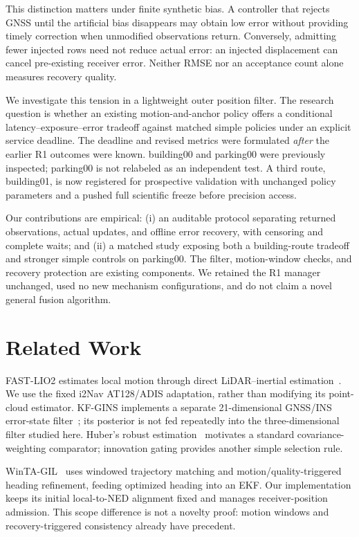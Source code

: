 \documentclass[conference]{IEEEtran}
\begin{document}
This distinction matters under finite synthetic bias. A controller that rejects GNSS until the artificial bias disappears may obtain low error without providing timely correction when unmodified observations return. Conversely, admitting fewer injected rows need not reduce actual error: an injected displacement can cancel pre-existing receiver error. Neither RMSE nor an acceptance count alone measures recovery quality.

We investigate this tension in a lightweight outer position filter. The research question is whether an existing motion-and-anchor policy offers a conditional latency--exposure--error tradeoff against matched simple policies under an explicit service deadline. The deadline and revised metrics were formulated \emph{after} the earlier R1 outcomes were known. building00 and parking00 were previously inspected; parking00 is not relabeled as an independent test. A third route, building01, is now registered for prospective validation with unchanged policy parameters and a pushed full scientific freeze before precision access.

Our contributions are empirical: (i) an auditable protocol separating returned observations, actual updates, and offline error recovery, with censoring and complete waits; and (ii) a matched study exposing both a building-route tradeoff and stronger simple controls on parking00. The filter, motion-window checks, and recovery protection are existing components. We retained the R1 manager unchanged, used no new mechanism configurations, and do not claim a novel general fusion algorithm.

\section{Related Work}
FAST-LIO2 estimates local motion through direct LiDAR--inertial estimation~\cite{fastlio2}. We use the fixed i2Nav AT128/ADIS adaptation, rather than modifying its point-cloud estimator. KF-GINS implements a separate 21-dimensional GNSS/INS error-state filter~\cite{kfgins}; its posterior is not fed repeatedly into the three-dimensional filter studied here. Huber's robust estimation~\cite{huber} motivates a standard covariance-weighting comparator; innovation gating provides another simple selection rule.

WinTA-GIL~\cite{winta} uses windowed trajectory matching and motion/quality-triggered heading refinement, feeding optimized heading into an EKF. Our implementation keeps its initial local-to-NED alignment fixed and manages receiver-position admission. This scope difference is not a novelty proof: motion windows and recovery-triggered consistency already have precedent.
\end{document}
